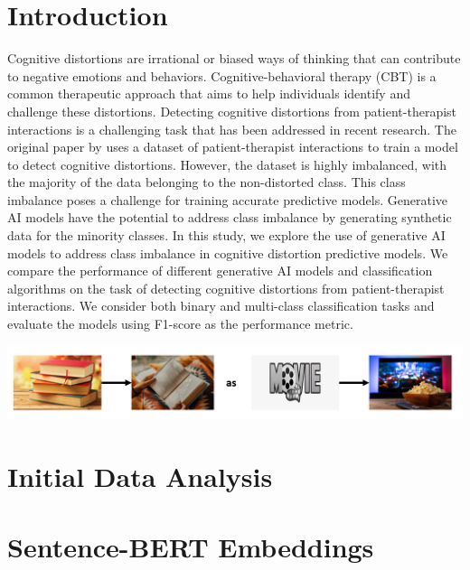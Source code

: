 \documentclass[a0,landscape]{a0poster}
\begin{document}
\begin{multicols}{4}
\color{Teal}

\section*{Introduction}
\color{Black}

Cognitive distortions are irrational or biased ways of thinking that can contribute to negative emotions and behaviors. Cognitive-behavioral therapy (CBT) is a common therapeutic approach that aims to help individuals identify and challenge these distortions. Detecting cognitive distortions from patient-therapist interactions is a challenging task that has been addressed in recent research. The original paper by \cite{original_paper} uses a dataset of patient-therapist interactions to train a model to detect cognitive distortions. However, the dataset is highly imbalanced, with the majority of the data belonging to the non-distorted class. This class imbalance poses a challenge for training accurate predictive models. Generative AI models have the potential to address class imbalance by generating synthetic data for the minority classes. In this study, we explore the use of generative AI models to address class imbalance in cognitive distortion predictive models. We compare the performance of different generative AI models and classification algorithms on the task of detecting cognitive distortions from patient-therapist interactions. We consider both binary and multi-class classification tasks and evaluate the models using F1-score as the performance metric.

\begin{center}\vspace{0.5cm}
\includegraphics[width=0.99\linewidth]{Example.png}
\end{center}\vspace{0.5cm}

\color{Teal}
\section*{Initial Data Analysis}
\color{Black}

\color{Teal}
\section*{Sentence-BERT Embeddings}
\color{Black}



\end{multicols}
\end{document}
